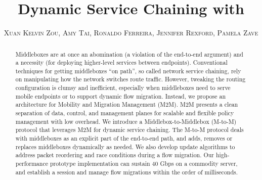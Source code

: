 \documentclass{sig-alternate-10pt}
\title{\LARGE\textbf{Dynamic Service Chaining with \system}}
\author{\textsc{Xuan Kelvin Zou, Amy Tai, Ronaldo Ferreira, Jennifer Rexford, Pamela Zave} }
\begin{document}
\maketitle  
\begin{abstract}


  Middleboxes  are    at once an  abomination    (a  violation  of the
  end-to-end argument)  and a  necessity (for  deploying  higher-level
  services between  endpoints).  Conventional  techniques  for getting
  middleboxes ``on path'', so called network service chaining, rely on
  manipulating how  the  network  switches  route traffic.    However,
  tweaking  the  routing  configuration   is clumsy  and  inefficient,
  especially when middleboxes  need to serve   mobile endpoints or  to
  support dynamic flow migration.  Instead, we propose an architecture
  for  Mobility and Migration  Management (M2M).  M2M presents a clean
  separation of data, control,  and management planes for scalable and
  flexible policy  management with  low   overhead.  We  introduce   a
  Middlebox-to-Middlebox   (M-to-M)  protocol that   leverages M2M for
  dynamic service  chaining.   The     M-to-M protocol   deals    with
  middleboxes as  an explicit part  of the  end-to-end path, and adds,
  removes   or replaces middleboxes  dynamically  as  needed.  We also
  develop update  algorithms to  address  packet reordering  and  race
  conditions during a  flow migration. Our  high-performance prototype
  implementation  can sustain 40  Gbps    on a commodity server,   and
  establish  a session and manage  flow migrations within the order of
  milliseconds.


 



\end{abstract}
\end{document}
